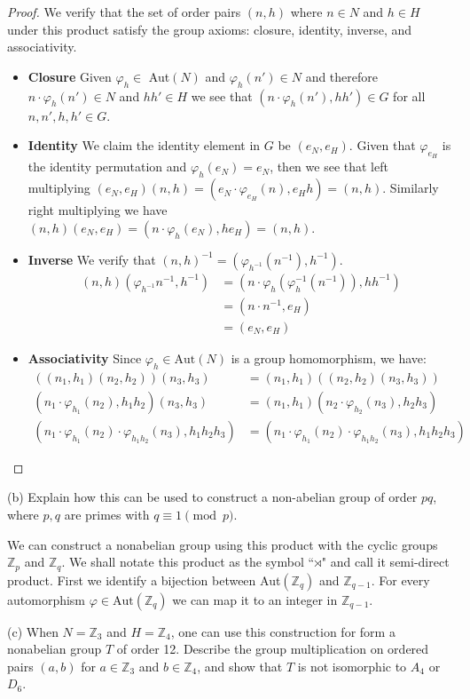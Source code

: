 \documentclass{article}
\theoremstyle{plain} %
\theoremstyle{definition} %
\newcommand{\bZ}{\mathbb{Z}}
\begin{document}
\begin{proof}
We verify that the set of order pairs $(n, h)$ where $n \in N$ and $h \in H$ under
this product satisfy the group axioms: closure, identity, inverse, and associativity.

\begin{itemize}
    \item \textbf{Closure} Given $\varphi_h \in$ Aut$(N)$ and $\varphi_h(n') \in N$ and therefore
    $n \cdot \varphi_h(n') \in N$ and $hh' \in H$ we see that $(n\cdot \varphi_h(n'), hh') \in G$ for all $n,n',h,h' \in G$.
    \item \textbf{Identity} We claim the identity element in $G$ be $(e_N, e_H)$. Given that $\varphi_{e_H}$ is the identity permutation
    and $\varphi_h(e_N) = e_N$, then we see that left multiplying $(e_N, e_H)(n,h) =
    (e_N \cdot \varphi_{e_H}(n), e_Hh)=(n,h)$. Similarly right multiplying we have 
    $(n,h)(e_N, e_H) = (n\cdot \varphi_h(e_N), he_H) = (n, h)$.
    \item \textbf{Inverse} We verify that $(n,h)^{-1} = (\varphi_{h^{-1}}(n^{-1}), h^{-1})$.
        \begin{align*}
            (n,h)(\varphi_{h^{-1}}n^{-1}, h^{-1}) &= (n\cdot \varphi_h(\varphi_h^{-1}(n^{-1})), hh^{-1}) \\
             &= (n\cdot n^{-1},e_H) \\
             &= (e_N, e_H)
        \end{align*}
    \item \textbf{Associativity} Since $\varphi_{h} \in \text{Aut}(N)$ is a group homomorphism, we have: 
        \begin{align*}
    ((n_1,h_1)(n_2,h_2))(n_3,h_3) &= (n_1,h_1)((n_2,h_2)(n_3,h_3)) \\
    (n_1\cdot \varphi_{h_1}(n_2),h_1h_2)(n_3,h_3) &= (n_1,h_1)(n_2 \cdot \varphi_{h_2}(n_3),h_2h_3) \\ 
    (n_1 \cdot \varphi_{h_1}(n_2)\cdot \varphi_{h_1h_2}(n_3), h_1h_2h_3) &= (n_1 \cdot \varphi_{h_1}(n_2)\cdot \varphi_{h_1h_2}(n_3), h_1h_2h_3)
        \end{align*}
\end{itemize}
\end{proof}

\noindent (b) Explain how this can be used to construct a non-abelian group of order $pq$, where $p, q$ are primes with $q \equiv 1 \pmod{p}$.

We can construct a nonabelian group using this product with the cyclic groups $\bZ_p$ and $\bZ_q$. We shall
notate this product as the symbol ``$\rtimes$" and call it semi-direct product. First we identify a bijection between
Aut$(\bZ_q)$ and $\bZ_{q-1}$. For every automorphism $\varphi \in \text{Aut}(\bZ_q)$ we can map it to an integer in $\bZ_{q-1}$. 

\noindent (c) When $N=\bZ_3$ and $H=\bZ_4$, one can use this construction for form
a nonabelian group $T$ of order 12. Describe the group multiplication on ordered pairs $(a,b)$ for
$a \in \bZ_3$ and $b \in \bZ_4$, and show that $T$ is not isomorphic to $A_4$ or $D_6$.
\end{document}
